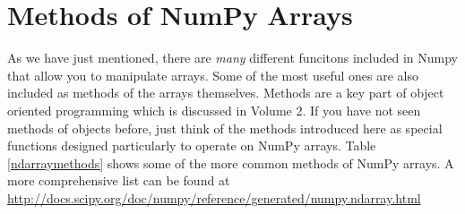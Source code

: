 \section*{Methods of NumPy Arrays}

As we have just mentioned, there are \emph{many} different funcitons included in Numpy that allow you to manipulate arrays.
Some of the most useful ones are also included as methods of the arrays themselves.
Methods are a key part of object oriented programming which is discussed in Volume 2.
If you have not seen methods of objects before, just think of the methods introduced here as special functions designed particularly to operate on NumPy arrays.
Table \ref{ndarraymethods} shows some of the more common methods of NumPy arrays.
A more comprehensive list can be found at \url{http://docs.scipy.org/doc/numpy/reference/generated/numpy.ndarray.html}

